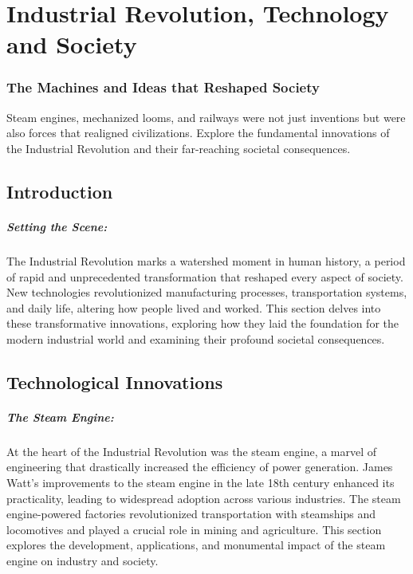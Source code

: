 \documentclass[a4paper,12pt]{book}
\begin{document}
\chapter{Industrial Revolution, Technology and Society}
\subsection*{The Machines and Ideas that Reshaped Society}
Steam engines, mechanized looms, and railways were not just inventions but were also forces that realigned civilizations. Explore the fundamental innovations of the Industrial Revolution and their far-reaching societal consequences.

\section*{Introduction}

\paragraph{Setting the Scene:}
The Industrial Revolution marks a watershed moment in human history, a period of rapid and unprecedented transformation that reshaped every aspect of society. New technologies revolutionized manufacturing processes, transportation systems, and daily life, altering how people lived and worked. This section delves into these transformative innovations, exploring how they laid the foundation for the modern industrial world and examining their profound societal consequences.

\section*{Technological Innovations}

\paragraph{The Steam Engine:}
At the heart of the Industrial Revolution was the steam engine, a marvel of engineering that drastically increased the efficiency of power generation. James Watt's improvements to the steam engine in the late 18th century enhanced its practicality, leading to widespread adoption across various industries. The steam engine-powered factories revolutionized transportation with steamships and locomotives and played a crucial role in mining and agriculture. This section explores the development, applications, and monumental impact of the steam engine on industry and society.
\end{document}
